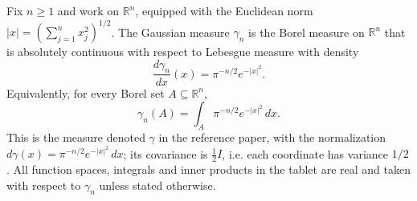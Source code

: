 \begin{definition}
Fix $n \geq 1$ and work on $\mathbb{R}^n$, equipped with the Euclidean norm
$|x| = (\sum_{j=1}^n x_j^2)^{1/2}$.  The Gaussian measure $\gamma_n$ is the Borel
measure on $\mathbb{R}^n$ that is absolutely continuous with respect to Lebesgue
measure with density
\[
  \frac{d\gamma_n}{dx}(x) = \pi^{-n/2} e^{-|x|^2}.
\]
Equivalently, for every Borel set $A \subseteq \mathbb{R}^n$,
\[
  \gamma_n(A) = \int_A \pi^{-n/2} e^{-|x|^2} \, dx .
\]
This is the measure denoted $\gamma$ in the reference paper, with the
normalization $d\gamma(x) = \pi^{-n/2} e^{-|x|^2}\,dx$; its covariance is
$\tfrac12 I$, i.e. each coordinate has variance $1/2$.  All function spaces,
integrals and inner products in the tablet are real and taken with respect to
$\gamma_n$ unless stated otherwise.
\end{definition}
